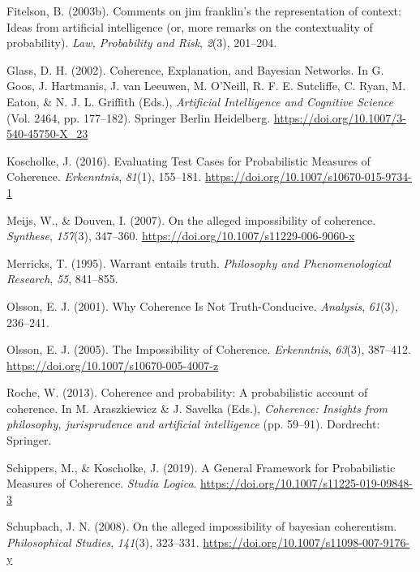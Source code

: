\documentclass[10pt,]{scrartcl}
\begin{document}
\hypertarget{ref-fitelson2003comments}{}
Fitelson, B. (2003b). Comments on jim franklin's the representation of
context: Ideas from artificial intelligence (or, more remarks on the
contextuality of probability). \emph{Law, Probability and Risk},
\emph{2}(3), 201--204.

\hypertarget{ref-glass2002}{}
Glass, D. H. (2002). Coherence, Explanation, and Bayesian Networks. In
G. Goos, J. Hartmanis, J. van Leeuwen, M. O'Neill, R. F. E. Sutcliffe,
C. Ryan, M. Eaton, \& N. J. L. Griffith (Eds.), \emph{Artificial
Intelligence and Cognitive Science} (Vol. 2464, pp. 177--182). Springer
Berlin Heidelberg. \url{https://doi.org/10.1007/3-540-45750-X_23}

\hypertarget{ref-koscholke2016evaluating}{}
Koscholke, J. (2016). Evaluating Test Cases for Probabilistic Measures
of Coherence. \emph{Erkenntnis}, \emph{81}(1), 155--181.
\url{https://doi.org/10.1007/s10670-015-9734-1}

\hypertarget{ref-meijs2007}{}
Meijs, W., \& Douven, I. (2007). On the alleged impossibility of
coherence. \emph{Synthese}, \emph{157}(3), 347--360.
\url{https://doi.org/10.1007/s11229-006-9060-x}

\hypertarget{ref-Merricks1995}{}
Merricks, T. (1995). Warrant entails truth. \emph{Philosophy and
Phenomenological Research}, \emph{55}, 841--855.

\hypertarget{ref-olsson2001}{}
Olsson, E. J. (2001). Why Coherence Is Not Truth-Conducive.
\emph{Analysis}, \emph{61}(3), 236--241.

\hypertarget{ref-olsson2005}{}
Olsson, E. J. (2005). The Impossibility of Coherence. \emph{Erkenntnis},
\emph{63}(3), 387--412. \url{https://doi.org/10.1007/s10670-005-4007-z}

\hypertarget{ref-Roche2013Coherence}{}
Roche, W. (2013). Coherence and probability: A probabilistic account of
coherence. In M. Araszkiewicz \& J. Savelka (Eds.), \emph{Coherence:
Insights from philosophy, jurisprudence and artificial intelligence}
(pp. 59--91). Dordrecht: Springer.

\hypertarget{ref-Schippers2019General}{}
Schippers, M., \& Koscholke, J. (2019). A General Framework for
Probabilistic Measures of Coherence. \emph{Studia Logica}.
\url{https://doi.org/10.1007/s11225-019-09848-3}

\hypertarget{ref-Schupbach2008Alleged}{}
Schupbach, J. N. (2008). On the alleged impossibility of bayesian
coherentism. \emph{Philosophical Studies}, \emph{141}(3), 323--331.
\url{https://doi.org/10.1007/s11098-007-9176-y}
\end{document}
